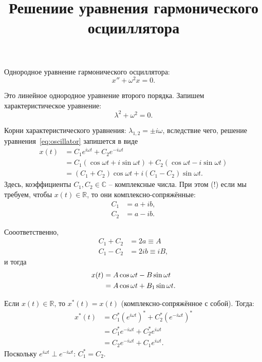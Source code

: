 \documentclass{report}
\title{Решениие уравнения гармонического осцииллятора}
\begin{document}
	\maketitle
	
Однородное уравнение гармонического осциллятора:
\begin{equation}\label{eq:oscillator}
x'' + \omega^2x = 0.
\end{equation}

Это линейное однородное уравнение второго порядка. Запишем характеристическое уравнение:
\[
\lambda^2 + \omega^2 = 0.
\]

Корни характеристического уравнения: $\lambda_{1,2} = \pm i\omega$, вследствие чего, решение
уравнения~\eqref{eq:oscillator} запишется в виде
\begin{align*}
x(t) &= C_1 e^{i\omega t} + C_2 e^{-i\omega t}\\
&= C_1(\cos\omega t + i\sin\omega t) + C_2(\cos\omega t - i\sin\omega t) \\ 
&= (C_1+C_2)\cos\omega t + i(C_1-C_2)\sin\omega t.
\end{align*}
Здесь, коэффициенты $C_1,C_2\in\mathbb{C}$ -- комплексные числа. При этом (!) если мы требуем, чтобы $x(t)\in\mathbb{R}$,  то они комплексно-сопряжённые:
\begin{align*}
C_1 &= a + ib, \\
C_2 &= a - ib.
\end{align*}

Сооответственно, 
\begin{align*}
	C_1 + C_2 &= 2a \equiv A\\
	C_1 - C_2 &= 2ib \equiv iB,
\end{align*} 
и тогда
\begin{align}
x(t) &= A\cos\omega t - B\sin\omega t \notag\\
&= A\cos\omega t + B_1\sin\omega t.
\end{align}

\begin{rmk}
	Если $x(t)\in\mathbb{R}$, то $x^*(t) = x(t)$ (комплексно-сопряжённое с собой). Тогда:
	\begin{align*}
		x^*(t) &= C_1^*(e^{i\omega t})^* + C_2^*(e^{-i\omega t})^* \\
		&= C_1^* e^{-i\omega t} + C_2^* e^{i\omega t} \\
		&= C_2 e^{-i\omega t} + C_1 e^{i\omega t}.
	\end{align*}
	Поскольку $e^{i\omega t}\perp e^{-i\omega t}$:
	$C_1^* = C_2$.
\end{rmk}
\end{document}
